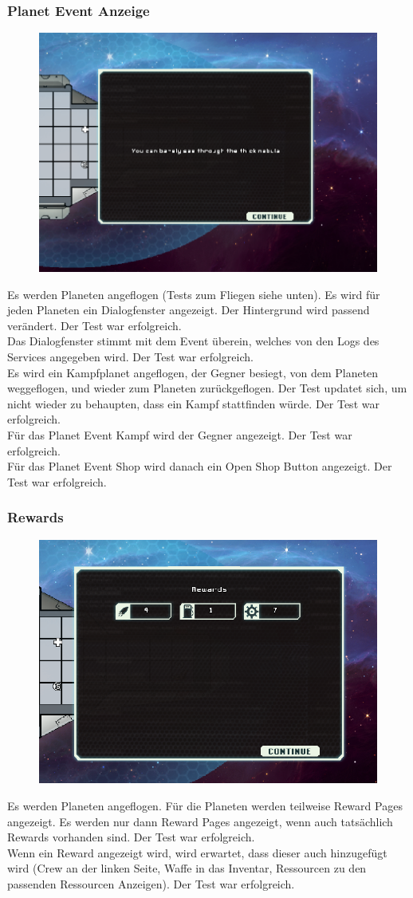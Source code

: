 \documentclass[fontsize=12pt,paper=a4,twoside]{scrartcl}
\begin{document}
\subsubsection{Planet Event Anzeige}
\begin{figure}[h!]
\centering
\includegraphics[width=0.5\linewidth]{images/event.png}
\end{figure}
Es werden Planeten angeflogen (Tests zum Fliegen siehe unten). Es wird für jeden Planeten ein Dialogfenster angezeigt. Der Hintergrund wird passend verändert. Der Test war erfolgreich. \\
Das Dialogfenster stimmt mit dem Event überein, welches von den Logs des Services angegeben wird. Der Test war erfolgreich. \\
Es wird ein Kampfplanet angeflogen, der Gegner besiegt, von dem Planeten weggeflogen, und wieder zum Planeten zurückgeflogen. Der Test updatet sich, um nicht wieder zu behaupten, dass ein Kampf stattfinden würde. Der Test war erfolgreich. \\
Für das Planet Event Kampf wird der Gegner angezeigt. Der Test war erfolgreich. \\
Für das Planet Event Shop wird danach ein Open Shop Button angezeigt. Der Test war erfolgreich. \\
\subsubsection{Rewards}
\begin{figure}[h!]
\centering
\includegraphics[width=0.5\linewidth]{images/rewards.png}
\end{figure}
Es werden Planeten angeflogen. Für die Planeten werden teilweise Reward Pages angezeigt. Es werden nur dann Reward Pages angezeigt, wenn auch tatsächlich Rewards vorhanden sind. Der Test war erfolgreich. \\
Wenn ein Reward angezeigt wird, wird erwartet, dass dieser auch hinzugefügt wird (Crew an der linken Seite, Waffe in das Inventar, Ressourcen zu den passenden Ressourcen Anzeigen). Der Test war erfolgreich. \\
\end{document}
